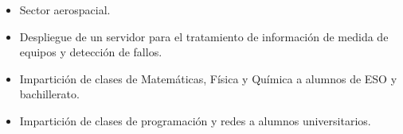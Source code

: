 \documentclass[10pt,a4paper,ragged2e]{altacv}
\begin{document}
\begin{itemize}
\item Sector aerospacial.
\item Despliegue de un servidor para el tratamiento de información de medida de equipos y detección de fallos.  
\end{itemize}
\divider

\begin{itemize}
\item Impartición de clases de Matemáticas, Física y Química a alumnos de ESO y bachillerato.
\item Impartición de clases de programación y redes a alumnos universitarios.
\end{itemize}
\divider



%






\clearpage

% 
% 
% 
% 
% 
% 
% 
\end{document}
